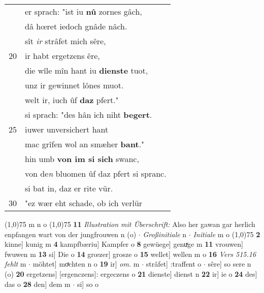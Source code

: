 \documentclass[8pt,a4paper,notitlepage]{article}
\begin{document}
\begin{table}[ht]
\begin{minipage}[t]{0.5\linewidth}
\begin{tabular}{rl}
 & er sprach: "ist iu \textbf{nû} zornes gâch,\\ 
 & dâ hœret iedoch gnâde nâch.\\ 
 & sît \textit{ir} strâfet mich sêre,\\ 
20 & ir habt ergetzens êre,\\ 
 & die wîle mîn hant iu \textbf{dienste} tuot,\\ 
 & unz ir gewinnet lônes muot.\\ 
 & welt ir,  iuch ûf \textbf{daz} pfert."\\ 
 & si sprach: "des hân ich niht \textbf{begert}.\\ 
25 & iuwer unversichert hant\\ 
 & mac grîfen wol an smæher \textbf{bant}."\\ 
 & hin umb \textbf{von im si sich} swanc,\\ 
 & von de\textit{n} bluomen ûf daz pfert si spranc.\\ 
 & si bat in, daz er rite vür.\\ 
30 & "ez wær eht schade, ob ich verlür\\ 
\end{tabular}
\scriptsize
\line(1,0){75} \newline
m n o \newline
\line(1,0){75} \newline
\textbf{11} \textit{Illustration mit Überschrift:} Also her gawan gar herlich enpfangen wart von der jungfrouwen n (o)   $\cdot$ \textit{Großinitiale} n   $\cdot$ \textit{Initiale} m o  \newline
\line(1,0){75} \newline
\textbf{2} kinne] kunig m \textbf{4} kampfbæriu] Kampfer o \textbf{8} gewüege] genuͯge m \textbf{11} vrouwen] fwuwen m \textbf{13} si] Die o \textbf{14} grœzer] grosze o \textbf{15} wellet] wellen m o \textbf{16} \textit{Vers 515.16 fehlt} m   $\cdot$ möhtet] moͯchten n o \textbf{19} ir] \textit{om.} m  $\cdot$ strâfet] :traffent o  $\cdot$ sêre] so sere n (o) \textbf{20} ergetzens] [ergenczens]: ergeczens o \textbf{21} dienste] dienst n \textbf{22} ir] ie o \textbf{24} des] das o \textbf{28} den] dem m  $\cdot$ si] so o \newline
\end{minipage}
\end{table}
\newpage
\end{document}
